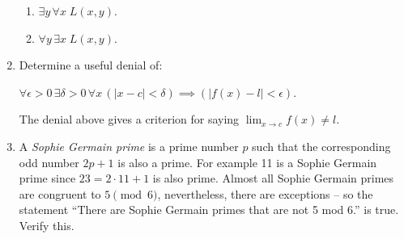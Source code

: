 \begin{enumerate}
{\begin{enumerate}
\vspace{.5in}

Here's a couple of bonus questions. Two of the statements above have different meanings if you just interchange the order that the quantifiers appear in. What do the following mean (in contrast to the ones above)?

\item $\exists y \, \forall x \; L(x, y)$.
\item $\forall y \, \exists x \; L(x,y)$.
\end{enumerate}

}

\wbvfill

\workbookpagebreak

\item Determine a useful denial of: 

$\displaystyle \forall \epsilon>0 \, \exists 
\delta>0 \, \forall x \, (|x-c| < \delta) \implies (|f(x)-l| < \epsilon) $.

The denial above gives a criterion for saying $\lim_{x\rightarrow c}f(x) \neq l.$


\wbvfill

\item A  \emph{Sophie Germain prime} is a prime number $p$
such that the corresponding odd number $2p+1$ is also a prime.  For example 11 is a 
Sophie Germain prime since $23 = 2\cdot 11 + 1$ is also prime.  Almost all Sophie Germain
primes are congruent to $5 \pmod{6}$, nevertheless, there are exceptions -- so the
statement ``There are Sophie Germain primes that are not 5 mod 6.'' is true.  Verify this.



\end{enumerate}
